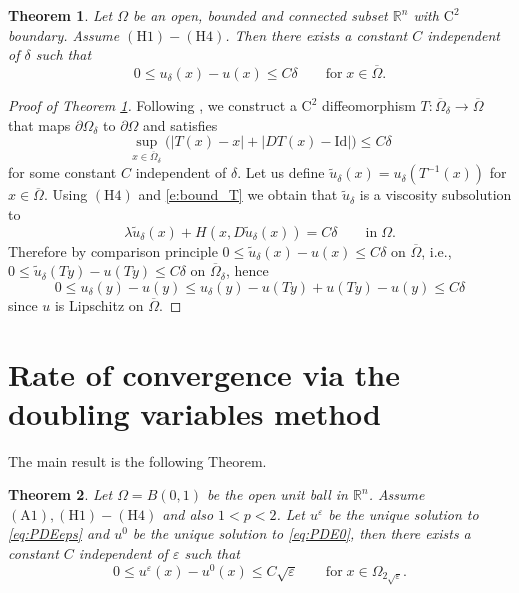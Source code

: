 \documentclass[11pt,reqno]{amsart}
\numberwithin{figure}{section}
\theoremstyle{plain}
\newtheorem{thm}{Theorem}[section]
\theoremstyle{remark}
\numberwithin{equation}{section}
\newcommand{\rmC}{\mathrm{C}}
\begin{document}
\begin{thm}\cite{Capuzzo-Dolcetta1990}\label{thm:conv_general} Let $\Omega$ be an open, bounded and connected subset $\mathbb{R}^n$ with $\mathrm{C}^2$ boundary. Assume $\mathrm{(H1)}-\mathrm{(H4)}$. 
Then there exists a constant $C$ independent of $\delta$ such that
\begin{equation*}
    0\leq u_\delta(x) - u(x) \leq C\delta \qquad\text{for}\; x\in \overline{\Omega}.
\end{equation*}
\end{thm}
\begin{proof}[Proof of Theorem \ref{thm:conv_general}] Following \cite{Capuzzo-Dolcetta1990}, we construct a $\rmC^2$ diffeomorphism $T:\overline{\Omega}_\delta\to \overline{\Omega}$ that maps $\partial\Omega_\delta$ to $\partial\Omega$ and satisfies
\begin{equation}\label{e:bound_T}
    \sup_{x\in \overline{\Omega}_\delta}\Big(|T(x)-x| + |DT(x) - \mathrm{Id}|\Big) \leq C\delta
\end{equation}
for some constant $C$ independent of $\delta$. Let us define $\tilde{u}_\delta(x) = u_\delta\left(T^{-1}(x)\right)$ for $x\in \overline{\Omega}$. Using $\mathrm{(H4)}$ and \eqref{e:bound_T} we obtain that $\tilde{u}_\delta$ is a viscosity subsolution to
\begin{equation*}
    \lambda \tilde{u}_\delta(x) + H(x,D\tilde{u}_\delta(x))  = C\delta \qquad\text{in}\;\Omega.
\end{equation*}
Therefore by comparison principle $0\leq \tilde{u}_\delta(x) - u(x) \leq C\delta$ on $\overline{\Omega}$, i.e., $0\leq \tilde{u}_\delta(Ty) - u(Ty) \leq C\delta$ on $\overline{\Omega}_\delta$, hence
\begin{equation*}
    0 \leq u_\delta(y) - u(y) \leq u_\delta(y) - u(Ty) + u(Ty) - u(y) \leq C\delta
\end{equation*}
since $u$ is Lipschitz on $\overline{\Omega}$.
\end{proof}


\section{Rate of convergence via the doubling variables method}
\noindent The main result is the following Theorem.
\begin{thm}\label{thm:rate_doubling1} Let $\Omega = B(0,1)$ be the open unit ball in $\mathbb{R}^n$. Assume $\mathrm{(A1)},\mathrm{(H1)}-\mathrm{(H4)}$ and also $1<p<2$. Let $u^\varepsilon$ be the unique solution to \eqref{eq:PDEeps} and $u^0$ be the unique solution to \eqref{eq:PDE0}, then there exists a constant $C$ independent of $\varepsilon$ such that
\begin{equation*}
    0\leq u^\varepsilon(x) - u^0(x) \leq C\sqrt{\varepsilon} \qquad\text{for}\;x\in \Omega_{2\sqrt{\varepsilon}}.
\end{equation*}
\end{thm}
\end{document}
